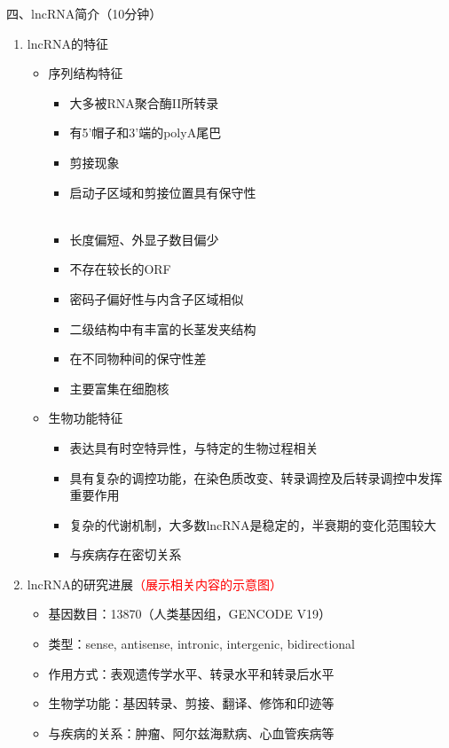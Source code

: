 \documentclass{TIJMUjiaoanLL}
\begin{document}
\vspace*{0.2cm}
\noindent
四、lncRNA简介（10分钟）
\begin{enumerate}
  \item lncRNA的特征
    \begin{itemize}
      \item 序列结构特征
	\vspace*{-10pt}
	\begin{multicols}{2}
        \begin{itemize}
	  \item 大多被RNA聚合酶II所转录
	  \item 有5'帽子和3'端的polyA尾巴
	  \item 剪接现象
	  \item 启动子区域和剪接位置具有保守性\\ \\
	  \item 长度偏短、外显子数目偏少
	  \item 不存在较长的ORF
	  \item 密码子偏好性与内含子区域相似
	  \item 二级结构中有丰富的长茎发夹结构
	  \item 在不同物种间的保守性差
	  \item 主要富集在细胞核
	\end{itemize}
      \end{multicols}
      \vspace*{-10pt}
    \end{itemize}

\otherTail
\newpage
\otherHeader

    \begin{itemize}
      \item 生物功能特征
        \begin{itemize}
	  \item 表达具有时空特异性，与特定的生物过程相关
	  \item 具有复杂的调控功能，在染色质改变、转录调控及后转录调控中发挥重要作用
	  \item 复杂的代谢机制，大多数lncRNA是稳定的，半衰期的变化范围较大
	  \item 与疾病存在密切关系
	\end{itemize}
    \end{itemize}
  \item lncRNA的研究进展\textcolor{red}{（展示相关内容的示意图）}
    \begin{itemize}
      \item 基因数目：13870（人类基因组，GENCODE V19）
      \item 类型：sense, antisense, intronic, intergenic, bidirectional
      \item 作用方式：表观遗传学水平、转录水平和转录后水平
      \item 生物学功能：基因转录、剪接、翻译、修饰和印迹等
      \item 与疾病的关系：肿瘤、阿尔兹海默病、心血管疾病等
    \end{itemize}
\end{enumerate}
\end{document}
